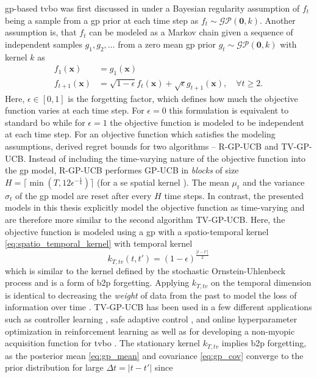 \gls{gp}-based \gls{tvbo} was first discussed in \textcite{Bogunovic_2016} under a Bayesian regularity assumption of $f_t$ being a sample from a \gls{gp} prior at each time step as $f_t \sim \mathcal{GP}(\mathbf{0}, k)$. Another assumption is, that $f_t$ can be modeled as a Markov chain given a sequence of independent samples $g_1, g_2, \dots$ from a zero mean \gls{gp} prior $g_t \sim \mathcal{GP}(\mathbf{0}, k)$ with kernel $k$ as
\begin{align}
    f_1(\mathbf{x}) &= g_1(\mathbf{x}) \\
    f_{t+1}(\mathbf{x}) &= \sqrt{1-\epsilon} f_{t}(\mathbf{x}) + \sqrt{\epsilon} g_{t+1}(\mathbf{x}), \quad \forall t \geq 2.
    \label{eq:markov_chain}
\end{align}
Here, $\epsilon \in [0, 1]$ is the forgetting factor, which defines how much the objective function varies at each time step. For $\epsilon=0$ this formulation is equivalent to standard \gls{bo} while for $\epsilon=1$ the objective function is modeled to be independent at each time step.
For an objective function which satisfies the modeling assumptions, \textcite{Bogunovic_2016} derived regret bounds for two algorithms -- R-GP-UCB and TV-GP-UCB. Instead of including the time-varying nature of the objective function into the \gls{gp} model, R-GP-UCB performes GP-UCB in \emph{blocks} of size $H = \lceil \min(T, 12\epsilon^{-\frac{1}{4}}) \rceil$ (for a \gls{se} spatial kernel \cite[Corollary~4.1]{Bogunovic_2016}). The mean $\mu_t$ and the variance $\sigma_t$ of the \gls{gp} model are reset after every $H$ time steps. In contrast, the presented models in this thesis explicitly model the objective function as time-varying and are therefore more similar to the second algorithm TV-GP-UCB. Here, the objective function is modeled using a \gls{gp} with a spatio-temporal kernel \eqref{eq:spatio_temporal_kernel} with temporal kernel
\begin{equation}
    k_{T,tv}(t, t') = (1-\epsilon)^{\frac{|t-t'|}{2}}
    \label{eq:tvkernel}
\end{equation}
which is similar to the kernel defined by the stochastic Ornstein-Uhlenbeck process and is a form of \gls{b2p} forgetting.
Applying $k_{T,tv}$ on the temporal dimension is identical to decreasing the \emph{weight} of data from the past to model the loss of information over time \cite{Bogunovic_2016}. TV-GP-UCB has been used in a few different applications such as controller learning \cite{Su_2018}, safe adaptive control \cite{Koenig_2021}, and online hyperparameter optimization in reinforcement learning \cite{Parker-Holder_2020}\cite{Parker-Holder_2021} as well as for developing a non-myopic acquisition function for \gls{tvbo} \cite{Renganathan_2020}. The stationary kernel $k_{T,tv}$ implies \gls{b2p} forgetting, as the posterior mean \eqref{eq:gp_mean} and covariance \eqref{eq:gp_cov} converge to the prior distribution for large $\Delta t = |t-t'|$ since
